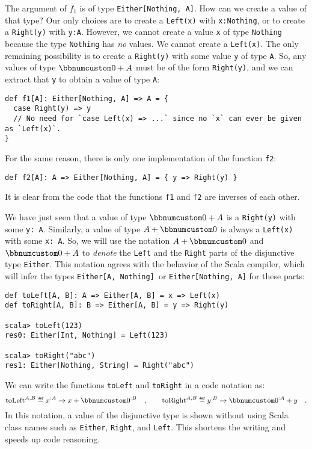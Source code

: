 The argument of $f_{1}$ is of type \lstinline!Either[Nothing, A]!.
How can we create a value of that type? Our only choices are to create
a \lstinline!Left(x)! with \lstinline!x:Nothing!, or to create a
\lstinline!Right(y)! with \lstinline!y:A!. However, we cannot create
a value \lstinline!x! of type \lstinline!Nothing! because the type
\lstinline!Nothing! has \emph{no} values. We cannot create a \lstinline!Left(x)!.
The only remaining possibility is to create a \lstinline!Right(y)!
with some value \lstinline!y! of type \lstinline!A!. So, any values
of type $\bbnum 0+A$ must be of the form \lstinline!Right(y)!, and
we can extract that \lstinline!y! to obtain a value of type \lstinline!A!:
\begin{lstlisting}
def f1[A]: Either[Nothing, A] => A = {
  case Right(y) => y
  // No need for `case Left(x) => ...` since no `x` can ever be given as `Left(x)`.
}
\end{lstlisting}
For the same reason, there is only one implementation of the function
\lstinline!f2!:
\begin{lstlisting}
def f2[A]: A => Either[Nothing, A] = { y => Right(y) }
\end{lstlisting}
It is clear from the code that the functions \lstinline!f1! and \lstinline!f2!
are inverses of each other.

We have just seen that a value of type $\bbnum 0+A$ is a \lstinline!Right(y)!
with some \lstinline!y: A!. Similarly, a value of type $A+\bbnum 0$
is always a \lstinline!Left(x)! with some \lstinline!x: A!. So,
we will use the notation $A+\bbnum 0$ and $\bbnum 0+A$ to \emph{denote}
the \lstinline!Left! and the \lstinline!Right! parts of the disjunctive
type \lstinline!Either!. This notation agrees with the behavior of
the Scala compiler, which will infer the types \lstinline!Either[A, Nothing] !or
\lstinline!Either[Nothing, A]! for these parts:
\begin{lstlisting}
def toLeft[A, B]: A => Either[A, B] = x => Left(x)
def toRight[A, B]: B => Either[A, B] = y => Right(y)

scala> toLeft(123)
res0: Either[Int, Nothing] = Left(123)

scala> toRight("abc")
res1: Either[Nothing, String] = Right("abc")
\end{lstlisting}
We can write the functions \lstinline!toLeft! and \lstinline!toRight!
in a code notation as:
\[
\text{toLeft}^{A,B}\triangleq x^{:A}\rightarrow x+\bbnum 0^{:B}\quad,\quad\quad\text{toRight}^{A,B}\triangleq y^{:B}\rightarrow\bbnum 0^{:A}+y\quad.
\]
In this notation, a value of the disjunctive type is shown without
using Scala class names such as \lstinline!Either!, \lstinline!Right!,
and \lstinline!Left!. This shortens the writing and speeds up code
reasoning. 

